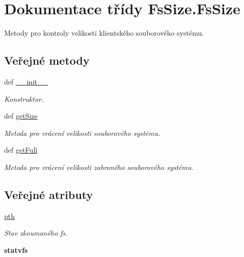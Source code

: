 \hypertarget{classFsSize_1_1FsSize}{\section{Dokumentace třídy Fs\-Size.\-Fs\-Size}
\label{d1/d81/classFsSize_1_1FsSize}
}


Metody pro kontroly velikosti klientského souborového systému.  


\subsection*{Veřejné metody}
\begin{DoxyCompactItemize}
\item 
def \hyperlink{classFsSize_1_1FsSize_a7457d0d8bc7d7dc7c51f72ef8918ddea}{\-\_\-\-\_\-init\-\_\-\-\_\-}
\begin{DoxyCompactList}\small\item\em Konstruktor. \end{DoxyCompactList}\item 
def \hyperlink{classFsSize_1_1FsSize_a988fd81d1518f72d3c93f49c986a0a47}{get\-Size}
\begin{DoxyCompactList}\small\item\em Metoda pro vrácení velikosti souborového systému. \end{DoxyCompactList}\item 
def \hyperlink{classFsSize_1_1FsSize_a4c53593300ce4fabcdf59d74a278fc3a}{get\-Full}
\begin{DoxyCompactList}\small\item\em Metoda pro vrácení velikosti zabraného souborového systému. \end{DoxyCompactList}\end{DoxyCompactItemize}
\subsection*{Veřejné atributy}
\begin{DoxyCompactItemize}
\item 
\hypertarget{classFsSize_1_1FsSize_af08b961cdfd8a46d5ec0307d96eedcf0}{\hyperlink{classFsSize_1_1FsSize_af08b961cdfd8a46d5ec0307d96eedcf0}{pth}}\label{d1/d81/classFsSize_1_1FsSize_af08b961cdfd8a46d5ec0307d96eedcf0}

\begin{DoxyCompactList}\small\item\em Stav zkoumaného fs. \end{DoxyCompactList}\item 
\hypertarget{classFsSize_1_1FsSize_a9bbcb4f1576e1e453d8a239d0bbe9d41}{{\bfseries statvfs}}\label{d1/d81/classFsSize_1_1FsSize_a9bbcb4f1576e1e453d8a239d0bbe9d41}

\end{DoxyCompactItemize}


